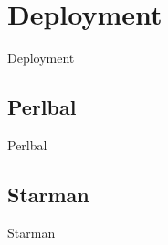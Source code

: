 \section{Deployment}
\begin{frame}{Deployment}
\end{frame}

\subsection{Perlbal}
\begin{frame}{Perlbal}
\end{frame}

\subsection{Starman}
\begin{frame}{Starman}
\end{frame}


